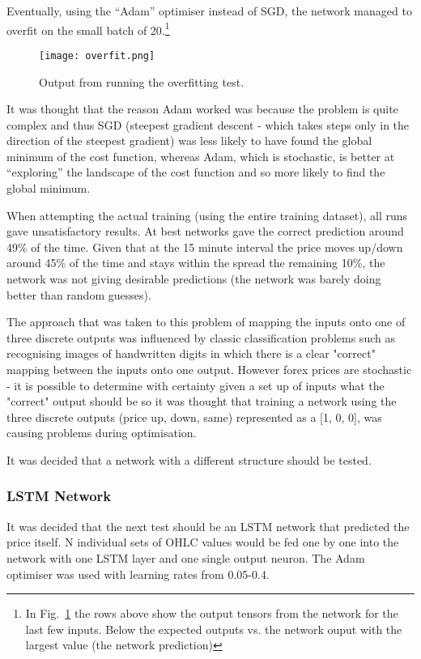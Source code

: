             Eventually, using the “Adam” optimiser instead of SGD, the network managed to overfit on the small batch of 20.\footnote{In Fig.~\ref{fig:Overfit} the rows above show the output tensors from the network for the last few inputs. Below the expected outputs vs. the network ouput with the largest value (the network prediction)}

            \begin{figure}[htbp]
                \centering
                \texttt{[image: overfit.png]}
                \caption{Output from running the overfitting test.}
                \label{fig:Overfit}
            \end{figure}
            

            It was thought that the reason Adam worked was because the problem is quite complex and thus SGD (steepest gradient descent - which takes steps only in the direction of the steepest gradient) was less likely to have found the global minimum of the cost function, whereas Adam, which is stochastic, is better at “exploring” the landscape of the cost function and so more likely to find the global minimum.

            When attempting the actual training (using the entire training dataset), all runs gave unsatisfactory results. At best networks gave the correct prediction around 49\% of the time. Given that at the 15 minute interval the price moves up/down around 45\% of the time and stays within the spread the remaining 10\%, the network was not giving desirable predictions (the network was barely doing better than random guesses).

            The approach that was taken to this problem of mapping the inputs onto one of three discrete outputs was influenced by classic classification problems such as recognising images of handwritten digits in which there is a clear "correct" mapping between the inputs onto one output. However forex prices are stochastic - it is possible to determine with certainty given a set up of inputs what the "correct" output should be so it was thought that training a network using the three discrete outputs (price up, down, same) represented as a [1, 0, 0], was causing problems during optimisation.

            It was decided that a network with a different structure should be tested.


            \subsubsection{LSTM Network}
            It was decided that the next test should be an LSTM network that predicted the price itself. N individual sets of OHLC values would be fed one by one into the network with one LSTM layer and one single output neuron. The Adam optimiser was used with learning rates from 0.05-0.4.

